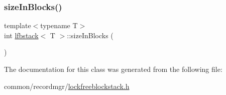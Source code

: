 \mbox{\label{classlfbstack_ab602d933c91551c9d52b768a43381cab}} 
\subsubsection{\texorpdfstring{size\+In\+Blocks()}{sizeInBlocks()}}
{\footnotesize\ttfamily template$<$typename T$>$ \\
int \hyperlink{classlfbstack}{lfbstack}$<$ T $>$\+::size\+In\+Blocks (\begin{DoxyParamCaption}{ }\end{DoxyParamCaption})\hspace{0.3cm}{\ttfamily [inline]}}



The documentation for this class was generated from the following file\+:\begin{DoxyCompactItemize}
\item 
common/recordmgr/\hyperlink{lockfreeblockstack_8h}{lockfreeblockstack.\+h}\end{DoxyCompactItemize}
